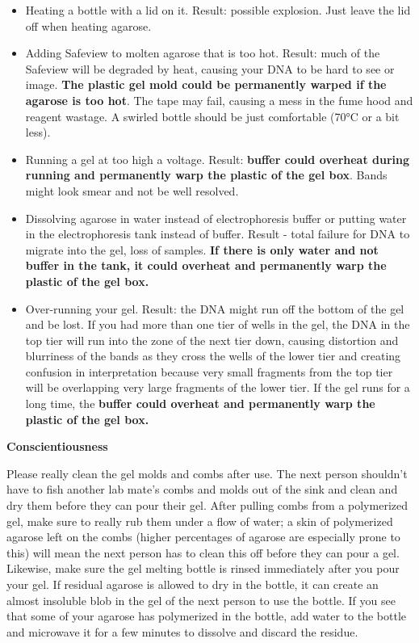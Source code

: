 \documentclass[
  letterpaper,
  DIV=11,
  numbers=noendperiod]{scrreprt}
\begin{document}
\begin{itemize}
\item
  Heating a bottle with a lid on it. Result: possible explosion. Just
  leave the lid off when heating agarose.
\item
  Adding Safeview to molten agarose that is too hot. Result: much of the
  Safeview will be degraded by heat, causing your DNA to be hard to see
  or image. \textbf{The plastic gel mold could be permanently warped if
  the agarose is too hot}. The tape may fail, causing a mess in the fume
  hood and reagent wastage. A swirled bottle should be just comfortable
  (70°C or a bit less).
\item
  Running a gel at too high a voltage. Result: \textbf{buffer could
  overheat during running and permanently warp the plastic of the gel
  box}. Bands might look smear and not be well resolved.
\item
  Dissolving agarose in water instead of electrophoresis buffer or
  putting water in the electrophoresis tank instead of buffer. Result -
  total failure for DNA to migrate into the gel, loss of samples.
  \textbf{If there is only water and not buffer in the tank, it could
  overheat and permanently warp the plastic of the gel box.}
\item
  Over-running your gel. Result: the DNA might run off the bottom of the
  gel and be lost. If you had more than one tier of wells in the gel,
  the DNA in the top tier will run into the zone of the next tier down,
  causing distortion and blurriness of the bands as they cross the wells
  of the lower tier and creating confusion in interpretation because
  very small fragments from the top tier will be overlapping very large
  fragments of the lower tier. If the gel runs for a long time, the
  \textbf{buffer could overheat and permanently warp the plastic of the
  gel box.}
\end{itemize}

\textbf{Conscientiousness}

Please really clean the gel molds and combs after use. The next person
shouldn't have to fish another lab mate's combs and molds out of the
sink and clean and dry them before they can pour their gel. After
pulling combs from a polymerized gel, make sure to really rub them under
a flow of water; a skin of polymerized agarose left on the combs (higher
percentages of agarose are especially prone to this) will mean the next
person has to clean this off before they can pour a gel. Likewise, make
sure the gel melting bottle is rinsed immediately after you pour your
gel. If residual agarose is allowed to dry in the bottle, it can create
an almost insoluble blob in the gel of the next person to use the
bottle. If you see that some of your agarose has polymerized in the
bottle, add water to the bottle and microwave it for a few minutes to
dissolve and discard the residue.
\end{document}
